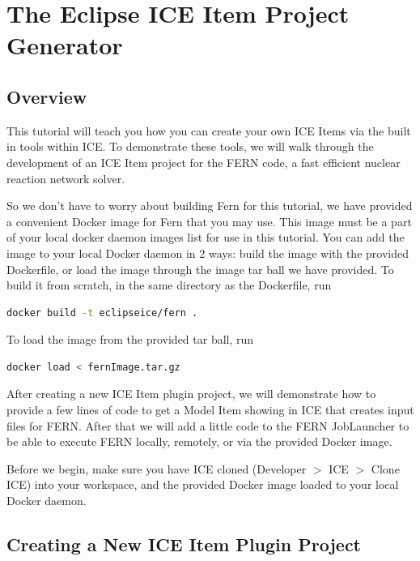 \chapter{The Eclipse ICE Item Project Generator}

\section*{Overview} 

This tutorial will teach you how you
can create your own ICE Items via the built in tools within ICE.  To demonstrate
these tools, we will walk through the development of an ICE Item project for the
FERN code, a fast efficient nuclear reaction network solver. 

So we don't have to worry about building Fern for this tutorial, we have
provided a convenient Docker image for Fern that you may use.  
This image must be a part of your local docker daemon images list for use in
this tutorial. You can add the image to your local Docker daemon in 2 ways: build the
image with the provided Dockerfile, or load the image through the image tar ball we have provided. To
build it from scratch, in the same directory as the Dockerfile, run 
\begin{lstlisting}[language=bash,caption={bash version}]
docker build -t eclipseice/fern .
\end{lstlisting}
To load the image from the provided tar ball, run 
\begin{lstlisting}[language=bash,caption={bash version}]
docker load < fernImage.tar.gz
\end{lstlisting}

After creating a new ICE Item plugin project, we will demonstrate how to
provide a few lines of code to get a Model Item showing in ICE that creates
input files for FERN. After that we will add a little code to the FERN
JobLauncher to be able to execute FERN locally, remotely, or via the
provided Docker image. 

Before we begin, make sure you have ICE cloned (Developer $>$ ICE $>$ Clone ICE)
into your workspace, and the provided Docker image loaded to your local Docker daemon. 

\section*{Creating a New ICE Item Plugin Project}

